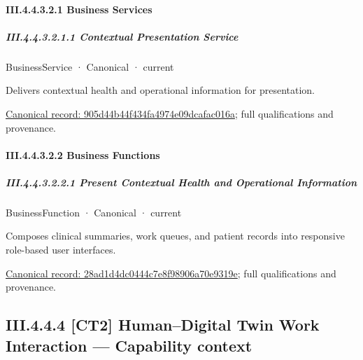 \paragraph*{III.4.4.3.2.1 Business Services}
\label{navigation:III.4.4.3.2.1}

\subparagraph*{III.4.4.3.2.1.1 Contextual Presentation Service}
\label{navigation:III.4.4.3.2.1.1}

\label{element:905d44b44f434fa4974e09dcafac016a}
{\small BusinessService · Canonical · current}\par

Delivers contextual health and operational information for presentation.


{\footnotesize \href{../../../../../../../../continuum/business/business-service/905d44b44f434fa4974e09dcafac016a.md}{Canonical record: 905d44b44f434fa4974e09dcafac016a}; full qualifications and provenance.}\par
\paragraph*{III.4.4.3.2.2 Business Functions}
\label{navigation:III.4.4.3.2.2}

\subparagraph*{III.4.4.3.2.2.1 Present Contextual Health and Operational Information}
\label{navigation:III.4.4.3.2.2.1}

\label{element:28ad1d4dc0444c7e8f98906a70e9319e}
{\small BusinessFunction · Canonical · current}\par

Composes clinical summaries, work queues, and patient records into responsive role-based user interfaces.


{\footnotesize \href{../../../../../../../../continuum/business/business-function/28ad1d4dc0444c7e8f98906a70e9319e.md}{Canonical record: 28ad1d4dc0444c7e8f98906a70e9319e}; full qualifications and provenance.}\par
\subsection*{III.4.4.4 [CT2] Human–Digital Twin Work Interaction — Capability context}
\label{navigation:III.4.4.4}

